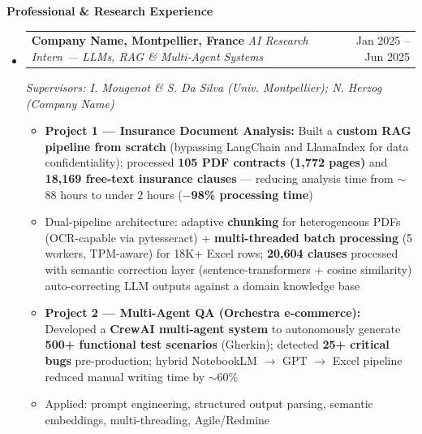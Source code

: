 \documentclass[11pt,a4paper]{article}
\makeatletter
\newcommand{\itemspace}{\vspace{0.4em}}
\newcommand{\sectionspace}{\itemspace}
\newcommand{\cvsection}[1]{
    \sectionspace
    \noindent\textcolor{primary}{\Large \textbf{#1}} \textcolor{primary}{\hrulefill}
    \par\vspace{0.4em}
}
\newcommand{\headerrow}[2]{
    \begin{tabular*}{\linewidth}{l@{\extracolsep{\fill}}r}
    #1 & \textcolor{primary}{#2} \\
    \end{tabular*}
}
\makeatother
\begin{document}
\clearpage
\cvsection{Professional \& Research Experience}
\begin{itemize}[leftmargin=1em, label={}]

    \item
    \headerrow{\textbf{Company Name, Montpellier, France} \quad \emph{AI Research Intern — LLMs, RAG \& Multi-Agent Systems}}{Jan 2025 -- Jun 2025}
    \emph{Supervisors: I. Mougenot \& S. Da Silva (Univ. Montpellier); N. Herzog (Company Name)}
    \begin{itemize}[leftmargin=1.5em, label=$\bullet$, nosep]
        \item \textbf{Project 1 — Insurance Document Analysis:} Built a \textbf{custom RAG pipeline from scratch} (bypassing LangChain and LlamaIndex for data confidentiality); processed \textbf{105 PDF contracts (1,772 pages)} and \textbf{18,169 free-text insurance clauses} — reducing analysis time from $\sim$88 hours to under 2 hours (\textbf{$-$98\% processing time})
        \item Dual-pipeline architecture: adaptive \textbf{chunking} for heterogeneous PDFs (OCR-capable via pytesseract) + \textbf{multi-threaded batch processing} (5 workers, TPM-aware) for 18K+ Excel rows; \textbf{20,604 clauses} processed with semantic correction layer (sentence-transformers + cosine similarity) auto-correcting LLM outputs against a domain knowledge base
        \item \textbf{Project 2 — Multi-Agent QA (Orchestra e-commerce):} Developed a \textbf{CrewAI multi-agent system} to autonomously generate \textbf{500+ functional test scenarios} (Gherkin); detected \textbf{25+ critical bugs} pre-production; hybrid NotebookLM $\to$ GPT $\to$ Excel pipeline reduced manual writing time by $\sim$60\%
        \item Applied: prompt engineering, structured output parsing, semantic embeddings, multi-threading, Agile/Redmine
    \end{itemize}


\end{itemize}
\end{document}
